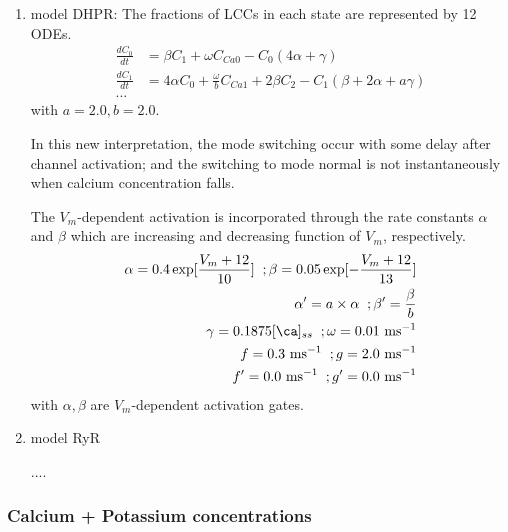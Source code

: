 \begin{enumerate}
\item model DHPR: The fractions of LCCs in each state are represented
  by 12 ODEs.
    \begin{equation}
      \label{eq:777}
      \begin{split}
        \frac{dC_0}{dt} &= \beta C_1 + \omega C_{Ca0} -
        C_0(4\alpha+\gamma) \\
        \frac{dC_1}{dt} &= 4\alpha C_0 + \frac{\omega}{b}C_{Ca1} +
        2\beta C_2 - C_1(\beta + 2\alpha+a\gamma) \\
        ...
      \end{split}
    \end{equation}
    with $a=2.0, b=2.0$.

    In this new interpretation, the mode switching occur with some
    delay after channel activation; and the switching to mode normal
    is not instantaneously when calcium concentration falls.

The $V_m$-dependent activation is incorporated through the rate constants
$\alpha$ and $\beta$ which are increasing and decreasing function of $V_m$,
respectively. 
    \begin{equation}
      \label{eq:763}
      \begin{split}
        \alpha = 0.4\exp[\frac{V_m+12}{10}] \;\;;
        \beta = 0.05 \exp[-\frac{V_m+12}{13}] \\
        \alpha'=a \times \alpha \;\;;
        \beta' = \frac{\beta}{b} \\
        \gamma = 0.1875 [\ca]_{ss} \;\;;
        \omega = 0.01 \text{ ms}^{-1} \\
        f = 0.3 \text{ ms}^{-1} \;\;;
        g = 2.0 \text{ ms}^{-1} \\
        f' = 0.0 \text{ ms}^{-1} \;\;;
        g' = 0.0 \text{ ms}^{-1} \\
      \end{split}
    \end{equation}
    with $\alpha, \beta$ are $V_m$-dependent activation gates. 
    
\item model RyR

....

\end{enumerate}


\subsubsection{Calcium + Potassium concentrations}
\label{sec:calcium-+-potassium}



